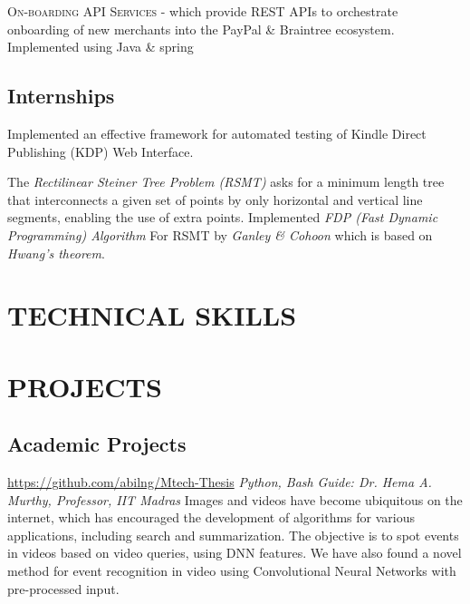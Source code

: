 \documentclass[11pt, a4paper, sans]{moderncv}
\begin{document}
{\textsc{On-boarding API Services} - which provide REST APIs to orchestrate onboarding of new merchants into the PayPal \& Braintree ecosystem. Implemented using Java \& spring \newline} 

\subsection{Internships}
{Implemented an effective framework for automated testing of Kindle Direct Publishing (KDP) Web Interface.}

{The \textit{Rectilinear Steiner Tree Problem (RSMT)} asks for a minimum length tree that interconnects a given set of points by only horizontal and vertical line segments, enabling the use of extra points. Implemented \textit{ FDP (Fast Dynamic Programming) Algorithm } For RSMT by \textit{ Ganley \& Cohoon } which is based on \textit{ Hwang’s theorem}}.

\section{TECHNICAL SKILLS}

\section{PROJECTS}
\subsection{Academic Projects}
{\newline \url{https://github.com/abilng/Mtech-Thesis}}
{\hfill \textit{Python, Bash}}
{\newline \textit{Guide: Dr. Hema A. Murthy, Professor, IIT Madras}}
{Images and videos have become ubiquitous on the internet, which has encouraged the development of algorithms for various applications, including search and summarization. The objective is to spot events in videos based on video queries, using DNN features. We have also found a novel method for event recognition in video using Convolutional Neural Networks with pre-processed input.}
\end{document}
